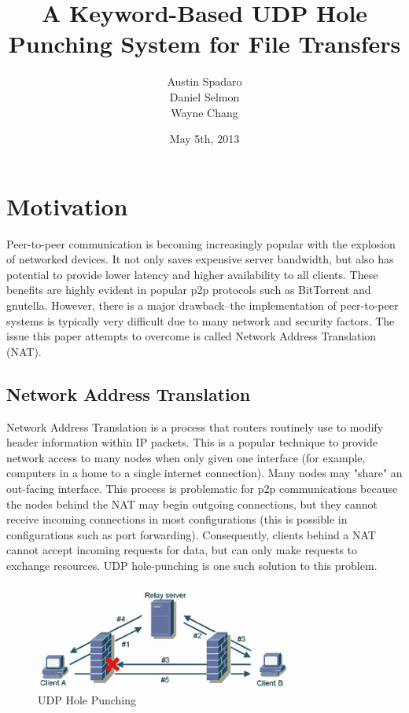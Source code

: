 \documentclass{article}
\title{A Keyword-Based UDP Hole Punching System for File Transfers}
\author{Austin Spadaro \\ Daniel Selmon \\ Wayne Chang}
\date{May 5th, 2013}
\begin{document}
\maketitle

\section{Motivation}
Peer-to-peer communication is becoming increasingly popular with the explosion of networked devices. It not only saves expensive server bandwidth, but also has potential to provide lower latency and higher availability to all clients. These benefits are highly evident in popular p2p protocols such as BitTorrent and gnutella. However, there is a major drawback--the implementation of peer-to-peer systems is typically very difficult due to many network and security factors. The issue this paper attempts to overcome is called Network Address Translation (NAT).

\subsection{Network Address Translation}
Network Address Translation is a process that routers routinely use to modify header information within IP packets. This is a popular technique to provide network access to many nodes when only given one interface (for example, computers in a home to a single internet connection). Many nodes may "share" an out-facing interface. This process is problematic for p2p communications because the nodes behind the NAT may begin outgoing connections, but they cannot receive incoming connections in most configurations (this is possible in configurations such as port forwarding). Consequently, clients behind a NAT cannot accept incoming requests for data, but can only make requests to exchange resources. UDP hole-punching is one such solution to this problem.

\begin{figure}[h!]
\centering
\includegraphics[scale=1]{UDP-Punching.png}
\caption{UDP Hole Punching}
\label{udphp}
\end{figure}
\end{document}
